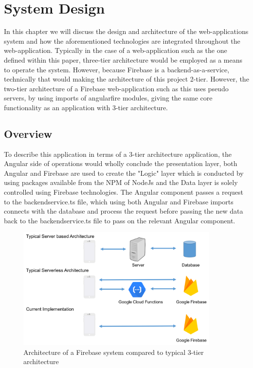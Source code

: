 \chapter{System Design}
In this chapter we will discuss the design and architecture of the web-applications system and how the aforementioned technologies are integrated throughout the web-application. Typically in the case of a web-application such as the one defined within this paper, three-tier architecture would be employed as a means to operate the system. However, because Firebase is a backend-as-a-service, technically that would making the architecture of this project 2-tier. However, the two-tier architecture of a Firebase web-application such as this uses pseudo servers, by using imports of angularfire modules, giving the same core functionality as an application with 3-tier architecture. 

\section{Overview}
To describe this application in terms of a 3-tier architecture application, the Angular side of operations would wholly conclude the presentation layer, both Angular and Firebase are used to create the "Logic" layer which is conducted by using packages available from the NPM of NodeJs and the Data layer is solely controlled using Firebase technologies. The Angular component passes a request to the backendservice.ts file, which using both Angular and Firebase imports connects with the database and process the request before passing the new data back to the backendservice.ts file to pass on the relevant Angular component.
\newpage
\begin{figure}[h!]
    	\caption{Architecture of a Firebase system compared to typical 3-tier architecture}
	\centering
	\includegraphics[width=0.9\textwidth]{images/architecture.png}
\end{figure}



